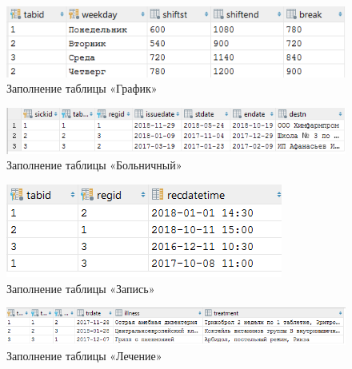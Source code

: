 \documentclass[14pt,a4paper,russian]{extreport}
\begin{document}
\vspace{0.00mm}

\begin{figure}[h]
        \center\includegraphics[scale=1]{itimetable}
        \caption{Заполнение таблицы «График»}
        \label{fig:itimetable}
\end{figure}

\vspace{0.00mm}

\begin{figure}[h]
        \center\includegraphics[scale=1]{sickleave}
        \caption{Заполнение таблицы «Больничный»}
        \label{fig:sickleave}
\end{figure}

\vspace{0.00mm}

\begin{figure}[h]
        \center\includegraphics[scale=1]{appointment}
        \caption{Заполнение таблицы «Запись»}
        \label{fig:appointment}
\end{figure}

\begin{figure}[h!]
        \center\includegraphics[width=\textwidth]{treatment}
        \caption{Заполнение таблицы «Лечение»}
        \label{fig:treatment}
\end{figure}
\vfill
\phantom{0000}
\end{document}
